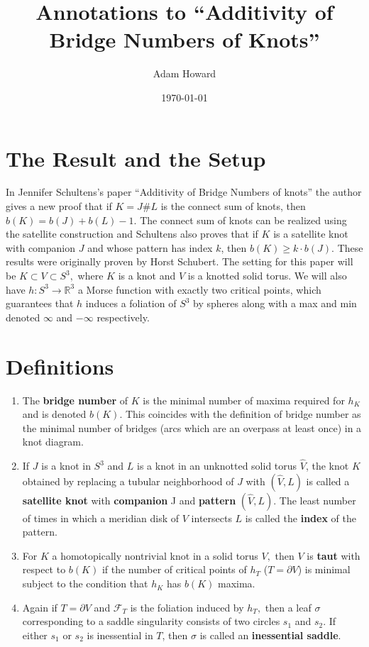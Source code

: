 \documentclass[11pt, oneside]{article}
\title{Annotations to ``Additivity of Bridge Numbers of Knots''}
\author{Adam Howard}
\date{\today}
\begin{document}
\maketitle



\section*{The Result and the Setup}
In Jennifer Schultens's paper ``Additivity of Bridge Numbers of knots'' the author gives a new proof that if $K = J \# L$ is the connect sum of knots, then $b(K) = b(J) + b(L) - 1.$ The connect sum of knots can be realized using the satellite construction and Schultens also proves that if $K$ is a satellite knot with companion $J$ and whose pattern has index $k$, then $b(K) \geq k\cdot b(J).$ These results were originally proven by Horst Schubert. \newline \newline The setting for this paper will be $K \subset V  \subset S^{3},$ where $K$ is a knot and $V$ is a knotted solid torus. We will also have $h: S^{3} \rightarrow \mathbb{R}^{3}$ a Morse function with exactly two critical points, which guarantees that $h$ induces a foliation of $S^{3}$ by spheres along with a max and min denoted $\infty$ and $-\infty$ respectively. 

\section*{Definitions}
\begin{enumerate}
\item The \textbf{bridge number} of $K$ is the minimal number of maxima required for $h_{K}$ and is denoted $b(K).$ This coincides with the definition of  bridge number as the minimal number of bridges (arcs which are an overpass at least once) in a knot diagram.
\item If $J$ is a knot in $S^{3}$ and $L$ is a knot in an unknotted solid torus $\hat{V}$, the knot $K$ obtained by replacing a tubular neighborhood of $J$ with $(\hat{V}, L)$ is called a \textbf{satellite knot} with \textbf{companion} J and \textbf{pattern} $(\hat{V}, L).$ The least number of times in which a meridian disk of $V$ intersects $L$ is called the \textbf{index} of the pattern.
\item For $K$ a homotopically nontrivial knot in a solid torus $V,$ then $V$ is \textbf{taut} with respect to $b(K)$ if the number of critical points of $h_{T}$ ($T = \partial V$) is minimal subject to the condition that $h_{K}$ has $b(K)$ maxima.  
\item Again if $T = \partial V$ and $\mathcal{F}_{T}$ is the foliation induced by $h_{T},$ then a leaf $\sigma$ corresponding to a saddle singularity consists of two circles $s_{1}$ and $s_{2}.$ If either $s_{1}$ or $s_{2}$ is inessential in $T$, then $\sigma$ is called an \textbf{inessential saddle}. 
\end{enumerate}
\end{document}
